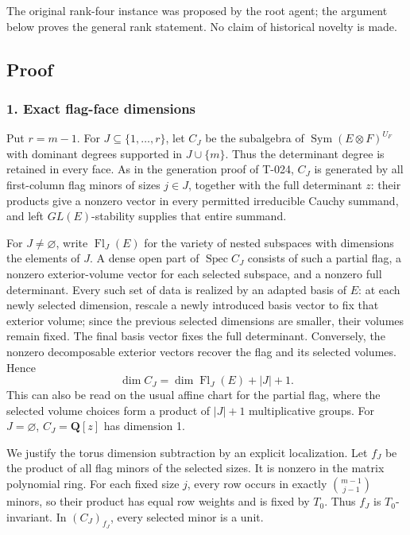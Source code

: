 \documentclass[
  10pt,
]{article}
\begin{document}
The original rank-four instance was proposed by the root agent; the
argument below proves the general rank statement. No claim of historical
novelty is made.

\subsection{Proof}\label{proof}

\subsubsection{1. Exact flag-face
dimensions}\label{exact-flag-face-dimensions}

Put \(r=m-1\). For \(J\subseteq\{1,\ldots,r\}\), let \(C_J\) be the
subalgebra of \(\operatorname{Sym}(E\otimes F)^{U_F}\) with dominant
degrees supported in \(J\cup\{m\}\). Thus the determinant degree is
retained in every face. As in the generation proof of T-024, \(C_J\) is
generated by all first-column flag minors of sizes \(j\in J\), together
with the full determinant \(z\): their products give a nonzero vector in
every permitted irreducible Cauchy summand, and left \(GL(E)\)-stability
supplies that entire summand.

For \(J\ne\varnothing\), write \(\operatorname{Fl}_J(E)\) for the
variety of nested subspaces with dimensions the elements of \(J\). A
dense open part of \(\operatorname{Spec}C_J\) consists of such a partial
flag, a nonzero exterior-volume vector for each selected subspace, and a
nonzero full determinant. Every such set of data is realized by an
adapted basis of \(E\): at each newly selected dimension, rescale a
newly introduced basis vector to fix that exterior volume; since the
previous selected dimensions are smaller, their volumes remain fixed.
The final basis vector fixes the full determinant. Conversely, the
nonzero decomposable exterior vectors recover the flag and its selected
volumes. Hence \[
\dim C_J=\dim\operatorname{Fl}_J(E)+|J|+1.
\tag{N.3}
\] This can also be read on the usual affine chart for the partial flag,
where the selected volume choices form a product of \(|J|+1\)
multiplicative groups. For \(J=\varnothing\), \(C_J=\mathbf Q[z]\) has
dimension 1.

We justify the torus dimension subtraction by an explicit localization.
Let \(f_J\) be the product of all flag minors of the selected sizes. It
is nonzero in the matrix polynomial ring. For each fixed size \(j\),
every row occurs in exactly \(\binom{m-1}{j-1}\) minors, so their
product has equal row weights and is fixed by \(T_0\). Thus \(f_J\) is
\(T_0\)-invariant. In \((C_J)_{f_J}\), every selected minor is a unit.
\end{document}
